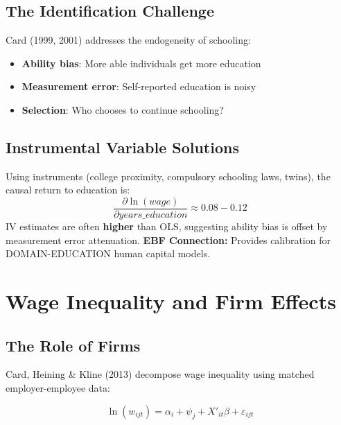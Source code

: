 \subsection{The Identification Challenge}

Card (1999, 2001) addresses the endogeneity of schooling:

\begin{itemize}
    \item \textbf{Ability bias}: More able individuals get more education
    \item \textbf{Measurement error}: Self-reported education is noisy
    \item \textbf{Selection}: Who chooses to continue schooling?
\end{itemize}

\subsection{Instrumental Variable Solutions}

\begin{axiom}
\label{ax:dc4}
Using instruments (college proximity, compulsory schooling laws, twins), the causal return to education is:
\begin{equation}
\frac{\partial \ln(wage)}{\partial years\_education} \approx 0.08-0.12
\end{equation}
IV estimates are often \textbf{higher} than OLS, suggesting ability bias is offset by measurement error attenuation.
\textbf{EBF Connection:} Provides calibration for DOMAIN-EDUCATION human capital models.
\end{axiom}

\section{Wage Inequality and Firm Effects}

\subsection{The Role of Firms}

Card, Heining \& Kline (2013) decompose wage inequality using matched employer-employee data:

\begin{equation}
\ln(w_{ijt}) = \alpha_i + \psi_j + X'_{it}\beta + \varepsilon_{ijt}
\end{equation}

